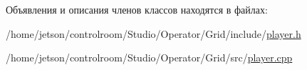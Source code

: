 Объявления и описания членов классов находятся в файлах\+:\begin{DoxyCompactItemize}
\item 
/home/jetson/controlroom/\+Studio/\+Operator/\+Grid/include/\hyperlink{_operator_2_grid_2include_2player_8h}{player.\+h}\item 
/home/jetson/controlroom/\+Studio/\+Operator/\+Grid/src/\hyperlink{_operator_2_grid_2src_2player_8cpp}{player.\+cpp}\end{DoxyCompactItemize}
